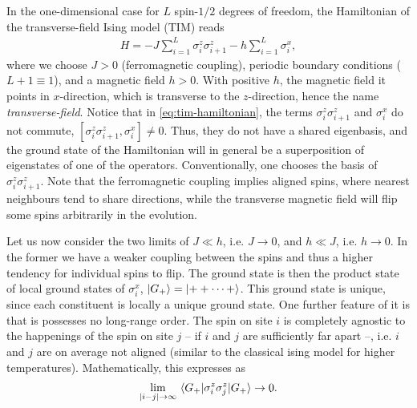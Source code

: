 In the one-dimensional
case for $L$ spin-$1 /2$ degrees of freedom, the Hamiltonian of the
transverse-field Ising model (TIM) reads
\begin{align}\label{eq:tim-hamiltonian}
  H = -J\sum_{i=1}^L \sigma_i^z \sigma_{i+1}^z - h\sum_{i=1}^L \sigma_i^x
,\end{align}
where we choose $J>0$ (ferromagnetic coupling), periodic boundary conditions
($L+1 \equiv 1$), and a magnetic field $h>0$. With
positive $h$, the magnetic field it points in $x$-direction, which is transverse to the
$z$-direction, hence the name \emph{transverse-field}. 
Notice that in \cref{eq:tim-hamiltonian}, the terms $\sigma_i^z\sigma_{i+1}^z$
and $\sigma_i^x$ do not commute, $[\sigma_i^z\sigma_{i+1}^z,\sigma_i^x]\neq 0$.
Thus, they do not have a shared eigenbasis, and the ground state of the
Hamiltonian will in general be a superposition of eigenstates of one of the
operators. Conventionally, one chooses the basis of $\sigma_i^z\sigma_{i+1}^z$.
Note that the ferromagnetic coupling implies aligned spins, where nearest
neighbours tend to share directions, while the transverse magnetic field will
flip some spins arbitrarily in the evolution.

Let us now consider the two limits of $J \ll h$, i.e. $J\to 0$,  and $h \ll J$,
i.e. $h \to 0$. In the former we have a weaker coupling between the spins and
thus a higher tendency for individual spins to flip. The ground state is then
the product state of local ground states of $\sigma_i^x$, $\ket{G_+} =
\ket{++\cdots +}$. This ground state is unique, since each constituent is
locally a
unique ground state. One further feature of it is that is possesses no
long-range order. The spin on site $i$ is completely agnostic to the happenings
of the spin on site $j$ -- if $i$ and $j$ are sufficiently far apart --, i.e.
$i$ and $j$ are on
average not aligned (similar to the classical ising model for higher
temperatures). Mathematically, this expresses as 
\begin{align}
\lim_{\abs{i-j}\to\infty} \expval{\sigma_i^z\sigma_j^z}{G_+} \to 0
.\end{align}

